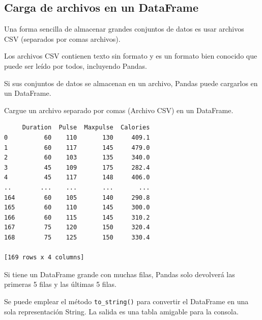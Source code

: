 \subsection{Carga de archivos en un DataFrame}

Una forma sencilla de almacenar grandes conjuntos de datos es usar
archivos CSV (separados por comas archivos).

Los archivos CSV contienen texto sin formato y es un formato bien
conocido que puede ser leído por todos, incluyendo Pandas.

Si sus conjuntos de datos se almacenan en un archivo, Pandas puede
cargarlos en un DataFrame.\\

\begin{code} Cargue un archivo separado por comas (Archivo CSV) en un DataFrame.

\begin{Shaded}
\begin{Highlighting}[]

\OperatorTok{=}\NormalTok{)}

\end{Highlighting}
\end{Shaded}

\begin{verbatim}
     Duration  Pulse  Maxpulse  Calories
0          60    110       130     409.1
1          60    117       145     479.0
2          60    103       135     340.0
3          45    109       175     282.4
4          45    117       148     406.0
..        ...    ...       ...       ...
164        60    105       140     290.8
165        60    110       145     300.0
166        60    115       145     310.2
167        75    120       150     320.4
168        75    125       150     330.4

[169 rows x 4 columns]
\end{verbatim}
\end{code}

Si tiene un DataFrame grande con muchas filas, Pandas solo devolverá las
primeras 5 filas y las últimas 5 filas.

Se puede emplear el método \texttt{to\_string()} para convertir el
DataFrame en una sola representación String. La salida es una tabla
amigable para la consola.\\

